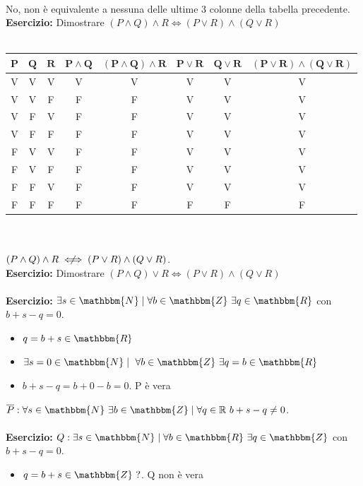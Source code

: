 \documentclass[12pt, letterpaper]{report}
\begin{document}
	\\
	No, non è equivalente a nessuna delle ultime 3 colonne della tabella precedente.
	\\
	\textbf{Esercizio: }Dimostrare $(P \wedge Q) \wedge R \iff (P \vee R) \wedge (Q \vee R)$
	\\
	\\
	\begin{tabular}{c|c|c|c|c|c|c|c}
		$\mathbf{P}$ & $\mathbf{Q}$ & $\mathbf{R}$ & $\mathbf{P \wedge Q}$ & $\mathbf{(P \wedge Q) \wedge R}$ & $\mathbf{P \vee R}$ & $\mathbf{Q \vee R}$ & $\mathbf{(P \vee R) \wedge (Q \vee R)}$ \\
		\hline
		V & V & V & V & V & V & V & V\\
		V & V & F & F & F & V & V & V\\
		V & F & V & F & F & V & V & V\\
		V & F & F & F & F & V & V & V\\
		F & V & V & F & F & V & V & V\\
		F & V & F & F & F & V & V & V\\
		F & F & V & F & F & V & V & V\\
		F & F & F & F & F & F & F & F\\
	\end{tabular}
	\\
	\\
	$(P \wedge Q) \wedge R \centernot \iff (P \vee R) \wedge (Q \vee R)$.
	\\
	\textbf{Esercizio: }Dimostrare $(P \wedge Q) \vee R \iff (P \vee R) \wedge (Q \vee R)$
	\\
	\\


	\newpage
	\textbf{Esercizio:} $\exists s \in \mathbbm{N} \mid \forall b \in \mathbbm{Z} \ \exists q \in \mathbbm{R}$ con $b + s - q = 0$.
	\begin{itemize}
		\item $q = b + s \in \mathbbm{R}$
		\item $\exists s = 0 \in \mathbbm{N} \mid \ \forall b \in \mathbbm{Z} \ \exists q = b \in \mathbbm{R}$
		\item $b + s - q = b + 0 - b = 0$. P è vera
	\end{itemize}

	$\overline P: \forall s \in \mathbbm{N} \ \exists b \in \mathbbm{Z} \mid \forall q \in \mathbb{R} \ b + s - q \not = 0$.
	\\
	\\
	\textbf{Esercizio:} $Q: \exists s \in \mathbbm{N} \mid \forall b \in \mathbbm{R} \ \exists q \in \mathbbm{Z}$ con $b + s - q = 0$.
	\begin{itemize}
		\item $q = b + s \in \mathbbm{Z} \ ? $. Q  non è vera
	\end{itemize}
\end{document}
